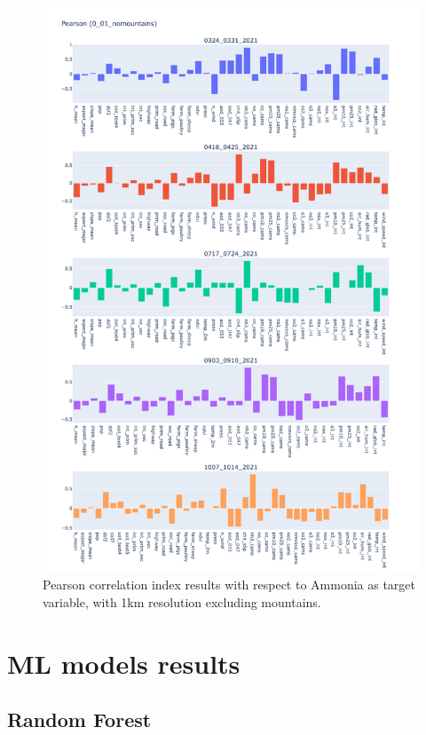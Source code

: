 \begin{figure}[H]
    \centering
    \includegraphics[scale=0.35]{images/tests/0_01_nomountainsnh3_st_pearson.png}
    \caption{Pearson correlation index results with respect to Ammonia as target variable, with 1km resolution excluding mountains.}
    \label{fig:overview}
\end{figure}

\section{ML models results}
\subsection{Random Forest}

